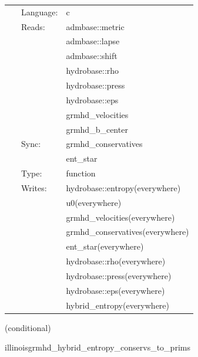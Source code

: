 \documentclass{article}
\begin{document}
 \begin{tabular*}{160mm}{cll} 
~ & Language:  & c \\ 
~ & Reads:  & admbase::metric \\ 
~& ~ &admbase::lapse\\ 
~& ~ &admbase::shift\\ 
~& ~ &hydrobase::rho\\ 
~& ~ &hydrobase::press\\ 
~& ~ &hydrobase::eps\\ 
~& ~ &grmhd\_velocities\\ 
~& ~ &grmhd\_b\_center\\ 
~ & Sync:  & grmhd\_conservatives \\ 
~& ~ &ent\_star\\ 
~ & Type:  & function \\ 
~ & Writes:  & hydrobase::entropy(everywhere) \\ 
~& ~ &u0(everywhere)\\ 
~& ~ &grmhd\_velocities(everywhere)\\ 
~& ~ &grmhd\_conservatives(everywhere)\\ 
~& ~ &ent\_star(everywhere)\\ 
~& ~ &hydrobase::rho(everywhere)\\ 
~& ~ &hydrobase::press(everywhere)\\ 
~& ~ &hydrobase::eps(everywhere)\\ 
~& ~ &hybrid\_entropy(everywhere)\\ 
\end{tabular*} 


\vspace{5mm}

   (conditional) 

\hspace{5mm} illinoisgrmhd\_hybrid\_entropy\_conservs\_to\_prims 

\hspace{5mm}{\it entropy+hybrid version of illinoisgrmhd\_conservs\_to\_prims } 


\hspace{5mm}
\end{document}
